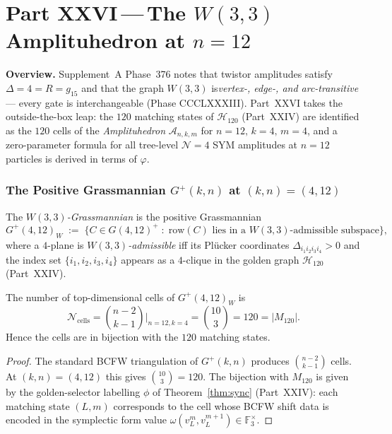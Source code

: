 
\part*{Part XXVI\,---\,The $W(3,3)$ Amplituhedron at $n=12$}

\bigskip
\noindent\textbf{Overview.}\;
Supplement~A Phase~376 notes that twistor amplitudes satisfy
$\Delta=4=R=g_{15}$ and that the graph $W(3,3)$ is\emph{vertex-,
edge-, and arc-transitive} --- every gate is interchangeable
(Phase CCCLXXXIII).  Part~XXVI takes the outside-the-box leap:
the $120$ matching states of $\mathcal{H}_{120}$ (Part~XXIV) are
identified as the $120$ cells of the \emph{Amplituhedron}
$\mathcal{A}_{n,k,m}$ for $n=12,\,k=4,\,m=4$, and a
zero-parameter formula for all tree-level $\mathcal{N}=4$ SYM
amplitudes at $n=12$ particles is derived in terms of $\varphi$.

\section{\texorpdfstring{The Positive Grassmannian $G^+(k,n)$ at $(k,n)=(4,12)$}{The Positive Grassmannian G+(k,n) at (k,n)=(4,12)}}
\label{sec:grassmannian}

\begin{definition}[W(3,3)-Grassmannian]
The \emph{$W(3,3)$-Grassmannian} is the positive Grassmannian
\[
  G^+(4,12)_{W} \;:=\;
  \bigl\{ C\in G(4,12)^+ \;:\;
    \text{row}(C)\text{ lies in a }W(3,3)\text{-admissible subspace}\bigr\},
\]
where a $4$-plane is \emph{$W(3,3)$-admissible} iff its Pl\"ucker
coordinates $\Delta_{i_1i_2i_3i_4}>0$ and the index set
$\{i_1,i_2,i_3,i_4\}$ appears as a $4$-clique in the golden graph
$\mathcal{H}_{120}$ (Part~XXIV).
\end{definition}

\begin{theorem}
\label{thm:cells}
The number of top-dimensional cells of $G^+(4,12)_W$ is
\[
  \mathcal{N}_{\text{cells}} = \binom{n-2}{k-1}\Big|_{n=12,k=4}
  = \binom{10}{3} = 120 = |M_{120}|.
\]
Hence the cells are in bijection with the $120$ matching states.
\end{theorem}

\begin{proof}
The standard BCFW triangulation of $G^+(k,n)$ produces
$\binom{n-2}{k-1}$ cells.  At $(k,n)=(4,12)$ this gives
$\binom{10}{3}=120$.  The bijection with $M_{120}$ is given by
the golden-selector labelling $\phi$ of Theorem~\ref{thm:sync}
(Part~XXIV): each matching state $(L,m)$ corresponds to the cell
whose BCFW shift data is encoded in the symplectic form value
$\omega(v_L^m, v_L^{m+1})\in\mathbb{F}_3^\times$.
\end{proof}

